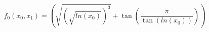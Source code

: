 \documentclass{article}
\begin{document}
\begin{equation}
f_0(x_0,x_1)=\left( \sqrt{ ( \sqrt{ln(x_0) } )^3 } +  \tan(\frac{\pi}{ \tan(ln(x_0) )} )\right)
\end{equation}
\end{document}
